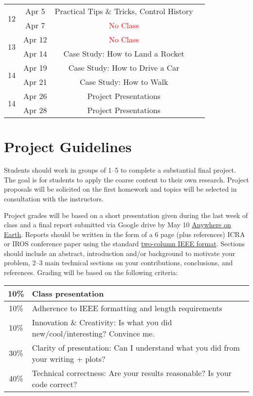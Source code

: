 \documentclass[11pt,letterpaper]{article}
\begin{document}
\begin{tabular}{c|c|c|c}
	 \hline
	\multirow{2}{*}{12}  & Apr 5 & Practical Tips \& Tricks, Control History &   \\
	 & Apr 7 & \textcolor{red}{No Class} &   \\
	 \hline
	\multirow{2}{*}{13}  & Apr 12 & \textcolor{red}{No Class} &  \\
	 & Apr 14 & Case Study: How to Land a Rocket &   \\
	 \hline
	\multirow{2}{*}{14}  & Apr 19 & Case Study: How to Drive a Car &  \\
	 & Apr 21 & Case Study: How to Walk &   \\
	 \hline
	\multirow{2}{*}{14}  & Apr 26 & Project Presentations &  \\
	 & Apr 28 & Project Presentations &   \\
\end{tabular}

\clearpage

\section*{Project Guidelines}

Students should work in groups of 1--5 to complete a substantial final project. The goal is for students to apply the coarse content to their own research. Project proposals will be solicited on the first homework and topics will be selected in consultation with the instructors.

\medskip
\noindent
Project grades will be based on a short presentation given during the last week of class and a final report submitted via Google drive by May 10 \href{https://time.is/Anywhere_on_Earth}{Anywhere on Earth}. Reports should be written in the form of a 6 page (plus references) ICRA or IROS conference paper using the standard \href{https://www.ieee.org/conferences/publishing/templates.html}{two-column IEEE format}. Sections should include an abstract, introduction and/or background to motivate your problem, 2--3 main technical sections on your contributions, conclusions, and references. Grading will be based on the following criteria:
\newline
\newline
\begin{tabular}{|c|l|}
\hline
10\% & Class presentation \\
\hline
10\% & Adherence to IEEE formatting and length requirements \\
\hline
10\% & Innovation \& Creativity: Is what you did new/cool/interesting? Convince me. \\
\hline
30\% & Clarity of presentation: Can I understand what you did from your writing + plots? \\
\hline
40\% & Technical correctness: Are your results reasonable? Is your code correct? \\
\hline	
\end{tabular}
\end{document}
